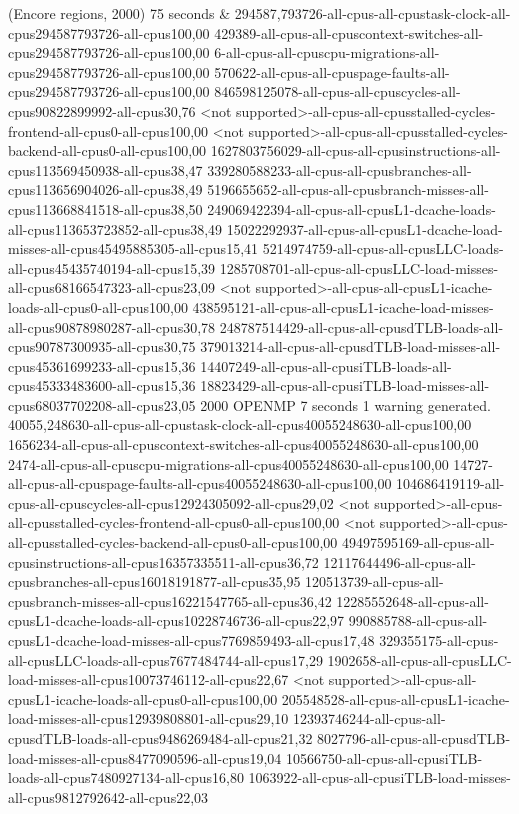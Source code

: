 (Encore regions, 2000) 75 seconds
&
294587,793726-all-cpus-all-cpustask-clock-all-cpus294587793726-all-cpus100,00
429389-all-cpus-all-cpuscontext-switches-all-cpus294587793726-all-cpus100,00
6-all-cpus-all-cpuscpu-migrations-all-cpus294587793726-all-cpus100,00
570622-all-cpus-all-cpuspage-faults-all-cpus294587793726-all-cpus100,00
846598125078-all-cpus-all-cpuscycles-all-cpus90822899992-all-cpus30,76
<not supported>-all-cpus-all-cpusstalled-cycles-frontend-all-cpus0-all-cpus100,00
<not supported>-all-cpus-all-cpusstalled-cycles-backend-all-cpus0-all-cpus100,00
1627803756029-all-cpus-all-cpusinstructions-all-cpus113569450938-all-cpus38,47
339280588233-all-cpus-all-cpusbranches-all-cpus113656904026-all-cpus38,49
5196655652-all-cpus-all-cpusbranch-misses-all-cpus113668841518-all-cpus38,50
249069422394-all-cpus-all-cpusL1-dcache-loads-all-cpus113653723852-all-cpus38,49
15022292937-all-cpus-all-cpusL1-dcache-load-misses-all-cpus45495885305-all-cpus15,41
5214974759-all-cpus-all-cpusLLC-loads-all-cpus45435740194-all-cpus15,39
1285708701-all-cpus-all-cpusLLC-load-misses-all-cpus68166547323-all-cpus23,09
<not supported>-all-cpus-all-cpusL1-icache-loads-all-cpus0-all-cpus100,00
438595121-all-cpus-all-cpusL1-icache-load-misses-all-cpus90878980287-all-cpus30,78
248787514429-all-cpus-all-cpusdTLB-loads-all-cpus90787300935-all-cpus30,75
379013214-all-cpus-all-cpusdTLB-load-misses-all-cpus45361699233-all-cpus15,36
14407249-all-cpus-all-cpusiTLB-loads-all-cpus45333483600-all-cpus15,36
18823429-all-cpus-all-cpusiTLB-load-misses-all-cpus68037702208-all-cpus23,05
2000 OPENMP 7 seconds
1 warning generated.
40055,248630-all-cpus-all-cpustask-clock-all-cpus40055248630-all-cpus100,00
1656234-all-cpus-all-cpuscontext-switches-all-cpus40055248630-all-cpus100,00
2474-all-cpus-all-cpuscpu-migrations-all-cpus40055248630-all-cpus100,00
14727-all-cpus-all-cpuspage-faults-all-cpus40055248630-all-cpus100,00
104686419119-all-cpus-all-cpuscycles-all-cpus12924305092-all-cpus29,02
<not supported>-all-cpus-all-cpusstalled-cycles-frontend-all-cpus0-all-cpus100,00
<not supported>-all-cpus-all-cpusstalled-cycles-backend-all-cpus0-all-cpus100,00
49497595169-all-cpus-all-cpusinstructions-all-cpus16357335511-all-cpus36,72
12117644496-all-cpus-all-cpusbranches-all-cpus16018191877-all-cpus35,95
120513739-all-cpus-all-cpusbranch-misses-all-cpus16221547765-all-cpus36,42
12285552648-all-cpus-all-cpusL1-dcache-loads-all-cpus10228746736-all-cpus22,97
990885788-all-cpus-all-cpusL1-dcache-load-misses-all-cpus7769859493-all-cpus17,48
329355175-all-cpus-all-cpusLLC-loads-all-cpus7677484744-all-cpus17,29
1902658-all-cpus-all-cpusLLC-load-misses-all-cpus10073746112-all-cpus22,67
<not supported>-all-cpus-all-cpusL1-icache-loads-all-cpus0-all-cpus100,00
205548528-all-cpus-all-cpusL1-icache-load-misses-all-cpus12939808801-all-cpus29,10
12393746244-all-cpus-all-cpusdTLB-loads-all-cpus9486269484-all-cpus21,32
8027796-all-cpus-all-cpusdTLB-load-misses-all-cpus8477090596-all-cpus19,04
10566750-all-cpus-all-cpusiTLB-loads-all-cpus7480927134-all-cpus16,80
1063922-all-cpus-all-cpusiTLB-load-misses-all-cpus9812792642-all-cpus22,03
